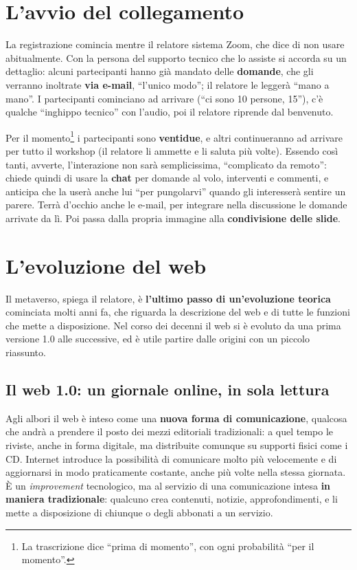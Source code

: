 \section{L'avvio del collegamento}
\label{z8:sec:avvio}

La registrazione comincia mentre il relatore sistema Zoom, che dice di non usare
abitualmente. Con la persona del supporto tecnico che lo assiste si accorda su
un dettaglio: alcuni partecipanti hanno già mandato delle \textbf{domande}, che
gli verranno inoltrate \textbf{via e-mail}, ``l'unico modo''; il relatore le
leggerà ``mano a mano''. I partecipanti cominciano ad arrivare (``ci sono 10
persone, 15''), c'è qualche ``inghippo tecnico'' con l'audio, poi il relatore
riprende dal benvenuto.

Per il momento\footnote{La trascrizione dice ``prima di momento'', con ogni
probabilità ``per il momento''.} i partecipanti sono \textbf{ventidue}, e altri
continueranno ad arrivare per tutto il workshop (il relatore li ammette e li
saluta più volte). Essendo così tanti, avverte, l'interazione non sarà
semplicissima, ``complicato da remoto'': chiede quindi di usare la
\textbf{chat} per domande al volo, interventi e commenti, e anticipa che la userà
anche lui ``per pungolarvi'' quando gli interesserà sentire un parere. Terrà
d'occhio anche le e-mail, per integrare nella discussione le domande arrivate da
lì. Poi passa dalla propria immagine alla \textbf{condivisione delle slide}.

\section{L'evoluzione del web}
\label{z8:sec:web}

Il metaverso, spiega il relatore, è \textbf{l'ultimo passo di un'evoluzione
teorica} cominciata molti anni fa, che riguarda la descrizione del web e di
tutte le funzioni che mette a disposizione. Nel corso dei decenni il web si è
evoluto da una prima versione 1.0 alle successive, ed è utile partire dalle
origini con un piccolo riassunto.

\subsection{Il web 1.0: un giornale online, in sola lettura}

Agli albori il web è inteso come una \textbf{nuova forma di comunicazione},
qualcosa che andrà a prendere il posto dei mezzi editoriali tradizionali: a quel
tempo le riviste, anche in forma digitale, ma distribuite comunque su supporti
fisici come i CD. Internet introduce la possibilità di comunicare molto più
velocemente e di aggiornarsi in modo praticamente costante, anche più volte
nella stessa giornata. È un \emph{improvement} tecnologico, ma al servizio di
una comunicazione intesa \textbf{in maniera tradizionale}: qualcuno crea
contenuti, notizie, approfondimenti, e li mette a disposizione di chiunque o
degli abbonati a un servizio.

